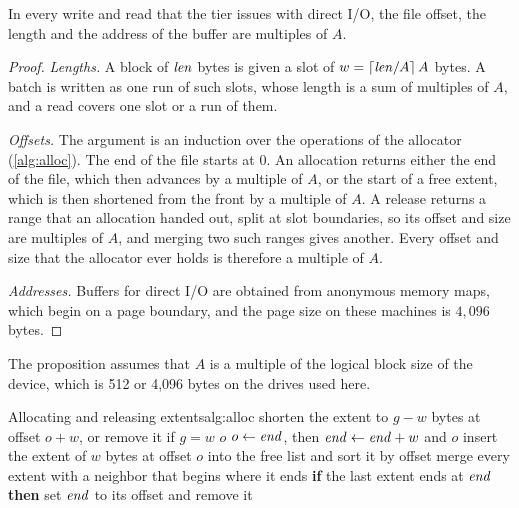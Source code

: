\begin{proposition}
\label{prop:align}%
In every write and read that the tier issues with direct I/O, the file
 offset, the length and the address of the buffer are multiples of $A$.
\end{proposition}

\begin{proof}
\emph{Lengths.} A block of $\mathit{len}$ bytes is given a slot of
$w = \lceil \mathit{len} / A \rceil\, A$ bytes. A batch is written as one run of
such slots, whose length is a sum of multiples of $A$, and a read covers one
 slot or a run of them.

\emph{Offsets.} The argument is an induction over the operations of the
allocator (\cref{alg:alloc}). The end of the file starts at $0$. An allocation returns either
the end of the file, which then advances by a multiple of $A$, or the start
of a free extent, which is then shortened from the front by a multiple of
$A$. A release returns a range that an allocation handed out, split at slot
boundaries, so its offset and size are multiples of $A$, and merging two such
ranges gives another. Every offset and size that the allocator ever holds is
therefore a multiple of $A$.

\emph{Addresses.} Buffers for direct I/O are obtained from anonymous memory
maps, which begin on a page boundary, and the page size on these machines is
$4{,}096$ bytes.
\end{proof}

The proposition assumes that $A$ is a multiple of the logical block size of
the device, which is 512 or 4,096 bytes on the drives used here.

\begin{pseudocode}{Allocating and releasing extents}{alg:alloc}
   
     
        \State shorten the extent to $g - w$ bytes at offset $o + w$, or remove it if $g = w$
        \State \Return $o$
      \EndIf
    \EndFor
    \State $o \gets \mathit{end}$, then $\mathit{end} \gets \mathit{end} + w$ and \Return $o$ 
  \EndFunction
   
    \State insert the extent of $w$ bytes at offset $o$ into the free list and sort it by offset
    \State merge every extent with a neighbor that begins where it ends
    \State \textbf{if} the last extent ends at $\mathit{end}$ \textbf{then} set $\mathit{end}$ to its offset and remove it
  \EndFunction
\end{pseudocode}

